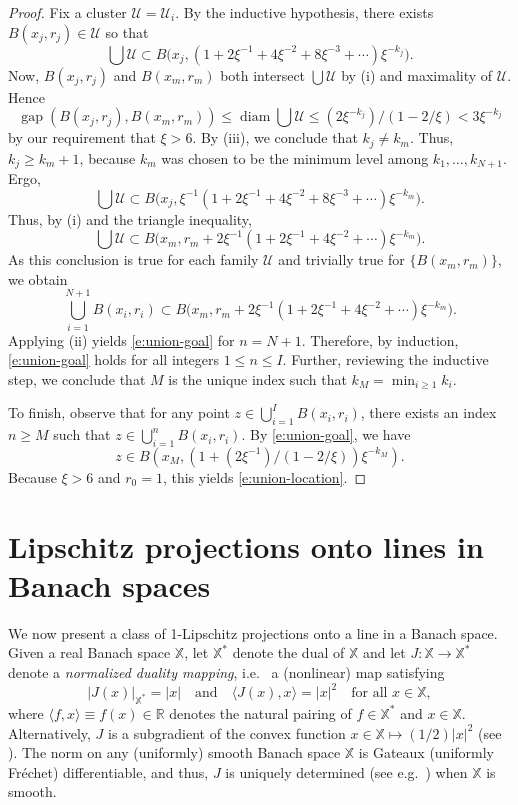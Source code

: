 \documentclass[12pt]{amsart}
\numberwithin{equation}{section}
\theoremstyle{plain}
\theoremstyle{definition}
\def\RR{\mathbb{R}}
\def\XX{{\mathbb{X}}}
\newcommand{\diam}{\mathop\mathrm{diam}\nolimits}
\newcommand{\gap}{\mathop\mathrm{gap}\nolimits}
\numberwithin{figure}{section}
\begin{document}
\begin{proof}
Fix a cluster $\mathscr{U}=\mathscr{U}_i$. By the inductive hypothesis, there exists $B(x_j,r_j)\in\mathscr{U}$ so that $$\textstyle\bigcup \mathscr{U}\subset B\big(x_j,(1+2\xi^{-1}+4\xi^{-2}+8\xi^{-3}+\cdots)\xi^{-k_j}\big).$$ Now, $B(x_j,r_j)$ and $B(x_m,r_m)$ both intersect $\bigcup\mathscr{U}$ by (i) and maximality of $\mathscr{U}$. Hence \begin{equation}\label{e:gap-from-above} \gap(B(x_j,r_j),B(x_m,r_m))\leq \diam \textstyle\bigcup \mathscr{U}
\leq (2\xi^{-k_j})/(1-2/\xi)<3\xi^{-k_j}\end{equation} by our requirement that $\xi>6$. By (iii), we conclude that $k_j\neq k_m$. Thus, $k_j\geq k_m+1$, because $k_m$ was chosen to be the minimum level among $k_1,\dots,k_{N+1}$.  Ergo, $$\textstyle\bigcup \mathscr{U} \subset B\big(x_j, \xi^{-1}(1+2\xi^{-1}+4\xi^{-2}+8\xi^{-3}+\cdots)\xi^{-k_m}\big).$$ Thus, by (i) and the triangle inequality, $$\textstyle\bigcup\mathscr{U}\subset B\big(x_m, r_m+2\xi^{-1}(1+2\xi^{-1}+4\xi^{-2}+\cdots)\xi^{-k_m}\big).$$ As this conclusion is true for each family $\mathscr{U}$ and trivially true for $\{B(x_m,r_m)\}$, we obtain  $$\textstyle\bigcup_{i=1}^{N+1}B(x_i,r_i)\subset B\big(x_m, r_m+2\xi^{-1}(1+2\xi^{-1}+4\xi^{-2}+\cdots)\xi^{-k_m}\big).$$  Applying (ii) yields \eqref{e:union-goal} for $n=N+1$. Therefore, by induction, \eqref{e:union-goal} holds for all integers $1\leq n\leq I$. Further, reviewing the inductive step, we conclude that $M$ is the unique index such that $k_M=\min_{i\geq 1} k_i$.

To finish, observe that for any point $z\in \bigcup_{i=1}^I B(x_i,r_i)$, there exists an index $n\geq M$ such that $z\in \bigcup_{i=1}^n B(x_i,r_i)$. By \eqref{e:union-goal}, we have $$z\in B\left (x_M, \left(1+(2\xi^{-1})/(1-2/\xi)\right)\xi^{-k_M}\right).$$ Because $\xi>6$ and $r_0=1$, this yields \eqref{e:union-location}.
\end{proof}

\section{Lipschitz projections onto lines in Banach spaces}\label{sec:smooth}

We now present a class of 1-Lipschitz projections onto a line in a Banach space. Given a real Banach space $\XX$, let $\XX^*$ denote the dual of $\XX$ and let $J: \XX \rightarrow \XX^*$ denote a \textit{normalized duality mapping}, i.e.~ a (nonlinear) map satisfying
\begin{equation}\label{J-properties}
|J(x)|_{\XX^*} = |x| \quad\text{and}\quad \langle J(x), x \rangle = |x|^2\quad\text{for all }x\in \XX,
\end{equation} where $\langle f,x\rangle\equiv f(x)\in\RR$ denotes the natural pairing of $f\in \XX^*$ and $x\in\XX$. Alternatively, $J$ is a subgradient of the convex function $x\in\XX\mapsto (1/2)|x|^2$ (see \cite{Asplund,Kien02}). The norm on any (uniformly) smooth Banach space $\XX$ is Gateaux (uniformly Fr\'echet) differentiable, and thus, $J$ is uniquely determined (see e.g.~\cite[Chapter Two]{Diestel}) when $\XX$ is smooth.
\end{document}
